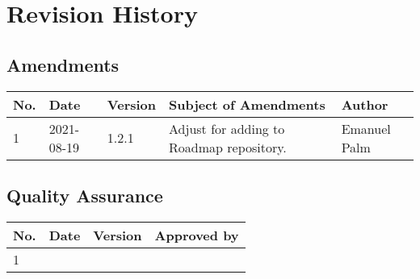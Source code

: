 \documentclass[a4paper]{arrowhead}
\begin{document}
%
%

\newpage

\section{Revision History}
\subsection{Amendments}

\noindent\begin{tabularx}{\textwidth}{| p{1cm} | p{2cm} | p{1.25cm} | X | p{4cm} |} \hline
\rowcolor{gray!33} No. & Date & Version & Subject of Amendments & Author \\ \hline

1 & 2021-08-19 & 1.2.1 & Adjust for adding to Roadmap repository. & Emanuel Palm \\ \hline

\end{tabularx}

\subsection{Quality Assurance}

\noindent\begin{tabularx}{\textwidth}{| p{1cm} | p{2cm} | p{1.25cm} | X |} \hline
\rowcolor{gray!33} No. & Date & Version & Approved by \\ \hline

1 & & & \\ \hline

\end{tabularx}
\end{document}

